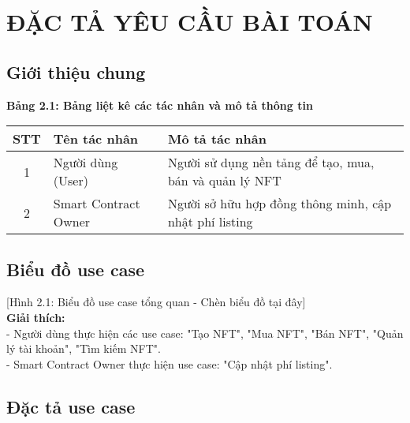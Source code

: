 \chapter{ĐẶC TẢ YÊU CẦU BÀI TOÁN}

\section{Giới thiệu chung}
\textbf{Bảng 2.1: Bảng liệt kê các tác nhân và mô tả thông tin}
\begin{center}
\begin{tabular}{|c|l|p{8cm}|}
    \hline
    \textbf{STT} & \textbf{Tên tác nhân} & \textbf{Mô tả tác nhân} \\
    \hline
    1 & Người dùng (User) & Người sử dụng nền tảng để tạo, mua, bán và quản lý NFT \\
    \hline
    2 & Smart Contract Owner & Người sở hữu hợp đồng thông minh, cập nhật phí listing \\
    \hline
\end{tabular}
\end{center}

\section{Biểu đồ use case}
[Hình 2.1: Biểu đồ use case tổng quan - Chèn biểu đồ tại đây] \\
\textbf{Giải thích:} \\
- Người dùng thực hiện các use case: "Tạo NFT", "Mua NFT", "Bán NFT", "Quản lý tài khoản", "Tìm kiếm NFT". \\
- Smart Contract Owner thực hiện use case: "Cập nhật phí listing".

\section{Đặc tả use case}

